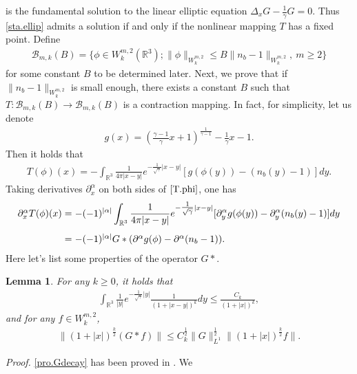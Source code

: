 \documentclass[11pt]{amsart}
\newtheorem{lemma}{Lemma}[section]
\numberwithin{equation}{section}
\begin{document}
is the fundamental solution to the linear elliptic equation $
\Delta_{x}G-\frac{1}{\gamma}G=0$. Thus \eqref{sta.ellip} admits a
solution if and only if the nonlinear mapping $T$ has a fixed point.
Define
\begin{eqnarray*}
\mathscr{B}_{m,k}(B)=\{\phi\in
W^{m,2}_{k}(\mathbb{R}^{3});\|\phi\|_{W^{m,2}_{k}}\leq
B\|n_{b}-1\|_{W^{m,2}_{k}},\ m\geq2\}
\end{eqnarray*}
for some constant $B$ to be determined later. Next, we prove that if
 $\|n_{b}-1\|_{W^{m,2}_{k}} $ is small enough, there exists a constant $B$ such that
$T:\mathscr{B}_{m,k}(B)\rightarrow \mathscr{B}_{m,k}(B) $ is a
contraction mapping. In fact, for simplicity, let us denote
\begin{eqnarray*}
g(x)=\left(\frac{\gamma-1}{\gamma}x+1\right)^{\frac{1}{\gamma-1}}-\frac{1}{\gamma}x-1.
\end{eqnarray*}
Then it holds that
\begin{eqnarray}\label{T.phi}
T(\phi)(x)=-\int_{\mathbb{R}^{3}}\frac{1}{4\pi|x-y|}e^{-\tfrac{1}{\sqrt{\gamma}}|x-y|}
[g(\phi(y))-(n_{b}(y)-1)]dy.
\end{eqnarray}
Taking derivatives $ \partial_{x}^{\alpha}$ on both sides of $
\eqref{T.phi}$, one has
\begin{eqnarray}\label{T.estimate}
\arraycolsep=1.5pt
\begin{array}[b]{rl}
\partial_{x}^{\alpha}T(\phi)(x)=&\displaystyle-(-1)^{|\alpha|}
\int_{\mathbb{R}^{3}}\frac{1}{4\pi|x-y|}e^{-\tfrac{1}{\sqrt{\gamma}}|x-y|}
[\partial^{\alpha}_{y}
g(\phi(y))-\partial^{\alpha}_{y}(n_{b}(y)-1)]dy\\[5mm]
=&-(-1)^{|\alpha|}G*(\partial^{\alpha}g(\phi)-\partial^{\alpha}(n_{b}-1)).
\end{array}
\end{eqnarray}
Here let's list some properties of the operator $G*$.
\begin{lemma}\label{Pro.OG}
For any $k\geq 0$, it holds that
\begin{eqnarray}\label{pro.Gdecay}
\int_{\mathbb{R}^{3}}\frac{1}{|y|}e^{-\tfrac{1}{\sqrt{\gamma}}|y|}\frac{1}{(1+|x-y|)^{k}}dy\leq
\frac{C_{k}}{(1+|x|)^{k}},
\end{eqnarray}
and for any $f\in W_{k}^{m,2}$,
\begin{eqnarray}\label{pro.G}
\|(1+|x|)^{\frac{k}{2}}(G*f)\|\leq C_{k}^{\frac{1}{2}}\|G\|_{L^{1}}^{\frac{1}{2}}\|(1+|x|)^{\frac{k}{2}}f\|.
\end{eqnarray}
\end{lemma}
\textit{Proof.} \eqref{pro.Gdecay} has been proved in \cite{RY}. We
\end{document}
